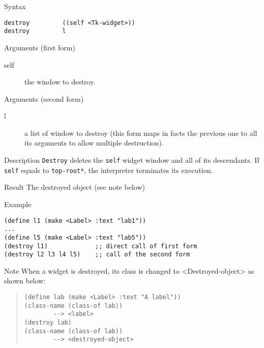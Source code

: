 %
%

\label{packer-doc}

\begin{schemedoc}{Syntax}
\begin{verbatim}
destroy         ((self <Tk-widget>))
destroy         l
\end{verbatim}
\end{schemedoc}

\begin{schemedoc}{Arguments (first form)}
\begin{description}
\item[self] the window to destroy.
\end{description}
\end{schemedoc}

\begin{schemedoc}{Arguments (second form)}
\begin{description}
\item[l] a list of window to destroy (this form maps in facts the previous one to
all its arguments to allow multiple destruction).
\end{description}
\end{schemedoc}

\begin{schemedoc}{Description}
{\tt Destroy} deletes the {\tt self} widget window and all of its descendants.
If {\tt self} equals to {\tt *top-root*}, the interpreter terminates its execution.
\end{schemedoc}

\begin{schemedoc}{Result}
The destroyed object (see note below)
\end{schemedoc}

\begin{schemedoc}{Example}
\begin{verbatim}
(define l1 (make <Label> :text "lab1"))
...
(define l5 (make <Label> :text "lab5"))
(destroy l1)             ;; direct call of first form
(destroy l2 l3 l4 l5)    ;; call of the second form
\end{verbatim}
\end{schemedoc}


\begin{schemedoc}{Note}
When a widget is destroyed, its class is changed to <Destroyed-object> as
shown below:
\begin{quote}
\begin{verbatim}
(define lab (make <Label> :text "A label"))
(class-name (class-of lab))
        --> <label>
(destroy lab)
(class-name (class-of lab))
        --> <destroyed-object>
\end{verbatim}
\end{quote}

\end{schemedoc}


